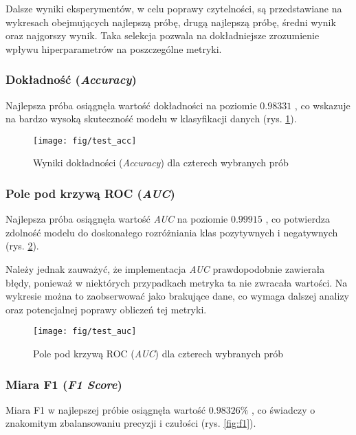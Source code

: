\documentclass[eeg_v4.tex]{subfiles}
\begin{document}
    Dalsze wyniki eksperymentów, w celu poprawy czytelności, są przedstawiane na wykresach obejmujących najlepszą próbę,
    drugą najlepszą próbę, średni wynik oraz najgorszy wynik. Taka selekcja pozwala na dokładniejsze zrozumienie wpływu
    hiperparametrów na poszczególne metryki.

    \subsubsection{Dokładność (\textit{Accuracy})}
    Najlepsza próba osiągnęła wartość dokładności na poziomie \(0.98331\)
    , co wskazuje na bardzo wysoką skuteczność modelu w klasyfikacji danych (rys. \ref{fig:accuracy}).

    \begin{figure}[h!]
        \centering
        \texttt{[image: fig/test\_acc]}
        \caption{Wyniki dokładności (\textit{Accuracy}) dla czterech wybranych prób}
        \label{fig:accuracy}
    \end{figure}

    \subsubsection{Pole pod krzywą ROC (\textit{AUC})}
    Najlepsza próba osiągnęła wartość \textit{AUC} na poziomie \(0.99915\)
    , co potwierdza zdolność modelu do doskonałego rozróżniania klas pozytywnych i negatywnych (rys. \ref{fig:auc}).

    Należy jednak zauważyć, że implementacja \textit{AUC}
    prawdopodobnie zawierała błędy, ponieważ w niektórych przypadkach metryka ta nie zwracała wartości. Na wykresie
    można to zaobserwować jako brakujące dane, co wymaga dalszej analizy oraz potencjalnej poprawy obliczeń tej metryki.

    \begin{figure}[h!]
        \centering
        \texttt{[image: fig/test\_auc]}
        \caption{Pole pod krzywą ROC (\textit{AUC}) dla czterech wybranych prób}
        \label{fig:auc}
    \end{figure}

    \subsubsection{Miara F1 (\textit{F1 Score})}
    Miara F1 w najlepszej próbie osiągnęła wartość \(0.98326\%\)
    , co świadczy o znakomitym zbalansowaniu precyzji i czułości (rys. \ref{fig:f1}).
\end{document}

